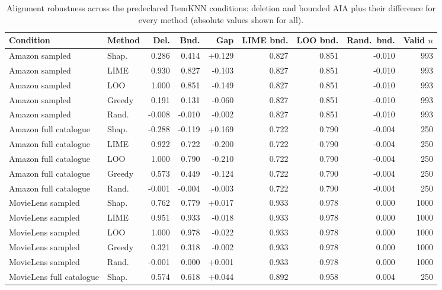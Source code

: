 \begin{table}[H]\centering\scriptsize\setlength{\tabcolsep}{2.5pt}
\caption{Alignment robustness across the predeclared ItemKNN conditions: deletion and
bounded AIA plus their difference for every method (absolute values shown for all).}
\label{tab:app-alignment}
\begin{tabular}{@{}llrrrrrrr@{}}
\toprule
Condition & Method & Del. & Bnd. & Gap & LIME bnd. & LOO bnd. & Rand.\ bnd. & Valid $n$ \\
\midrule
Amazon sampled & Shap. & 0.286 & 0.414 & +0.129 & 0.827 & 0.851 & -0.010 & 993 \\
Amazon sampled & LIME & 0.930 & 0.827 & -0.103 & 0.827 & 0.851 & -0.010 & 993 \\
Amazon sampled & LOO & 1.000 & 0.851 & -0.149 & 0.827 & 0.851 & -0.010 & 993 \\
Amazon sampled & Greedy & 0.191 & 0.131 & -0.060 & 0.827 & 0.851 & -0.010 & 993 \\
Amazon sampled & Rand. & -0.008 & -0.010 & -0.002 & 0.827 & 0.851 & -0.010 & 993 \\
Amazon full catalogue & Shap. & -0.288 & -0.119 & +0.169 & 0.722 & 0.790 & -0.004 & 250 \\
Amazon full catalogue & LIME & 0.922 & 0.722 & -0.200 & 0.722 & 0.790 & -0.004 & 250 \\
Amazon full catalogue & LOO & 1.000 & 0.790 & -0.210 & 0.722 & 0.790 & -0.004 & 250 \\
Amazon full catalogue & Greedy & 0.573 & 0.449 & -0.124 & 0.722 & 0.790 & -0.004 & 250 \\
Amazon full catalogue & Rand. & -0.001 & -0.004 & -0.003 & 0.722 & 0.790 & -0.004 & 250 \\
MovieLens sampled & Shap. & 0.762 & 0.779 & +0.017 & 0.933 & 0.978 & 0.000 & 1000 \\
MovieLens sampled & LIME & 0.951 & 0.933 & -0.018 & 0.933 & 0.978 & 0.000 & 1000 \\
MovieLens sampled & LOO & 1.000 & 0.978 & -0.022 & 0.933 & 0.978 & 0.000 & 1000 \\
MovieLens sampled & Greedy & 0.321 & 0.318 & -0.002 & 0.933 & 0.978 & 0.000 & 1000 \\
MovieLens sampled & Rand. & -0.001 & 0.000 & +0.001 & 0.933 & 0.978 & 0.000 & 1000 \\
MovieLens full catalogue & Shap. & 0.574 & 0.618 & +0.044 & 0.892 & 0.958 & 0.004 & 250 \\

\end{tabular}
\end{table}
